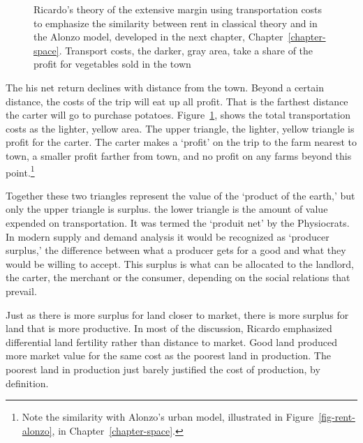 \begin{figure}[htb]
\begin{center}
    
\caption[Ricardo's theory of extensive margin.]{Ricardo's theory of the extensive margin using transportation costs to emphasize the similarity between rent in classical theory and in the Alonzo model, developed in the next chapter, Chapter~\ref{chapter-space}. Transport costs, the darker, gray area, take a share of the profit for vegetables sold in the town}
\label{fig-rent-ricardo}
\end{center}
\end{figure}

The his net return  declines with distance from the town. Beyond a certain distance, the costs of the trip will eat up all profit. That is the farthest distance the carter will go to purchase potatoes. %
Figure~\ref{fig-rent-ricardo}, shows the total transportation costs as the lighter, yellow area. The upper triangle,  the lighter,  yellow triangle is profit for the carter. The carter makes a `profit' on the trip to the farm nearest to town, a smaller profit farther from town, and no profit on any farms beyond this point.\footnote{Note the similarity with Alonzo's urban model, illustrated in Figure~\ref{fig-rent-alonzo}, in Chapter~\ref{chapter-space}.} 

Together these two triangles represent the  value of the `product of the earth,' but only the upper triangle is \gls{surplus}. the lower triangle is the amount of value expended on transportation. It was termed the `\gls{produit net}' by the Physiocrats. In modern supply and demand analysis it would be recognized as `\gls{producer surplus},' the difference between what a producer gets for a good and what they would be willing to accept. This surplus is what can be allocated to the landlord, the carter, the merchant or the consumer, depending on the social relations that prevail. 

Just as there is more surplus for land closer to market, there is more surplus for land that is more productive. In most of the discussion, Ricardo emphasized differential land fertility rather than distance to market. %
Good land produced more market value for the same cost as the poorest land in production. The poorest land in production just barely justified the cost of production, by definition. %

